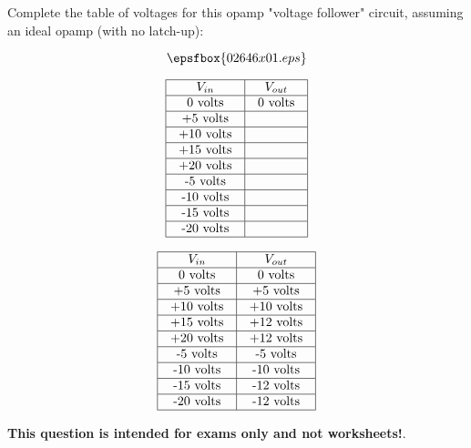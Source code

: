 

Complete the table of voltages for this opamp "voltage follower" circuit, assuming an ideal opamp (with no latch-up):

$$\epsfbox{02646x01.eps}$$


$$\vbox{\offinterlineskip
\halign{\strut
\vrule \quad\hfil # \ \hfil & 
\vrule \quad\hfil # \ \hfil \vrule \cr
\noalign{\hrule}
%
$V_{in}$ & $V_{out}$ \cr
%
\noalign{\hrule}
%
0 volts & 0 volts \cr
%
\noalign{\hrule}
%
+5 volts &  \cr
%
\noalign{\hrule}
%
+10 volts &  \cr
%
\noalign{\hrule}
%
+15 volts &  \cr
%
\noalign{\hrule}
%
+20 volts &  \cr
%
\noalign{\hrule}
%
-5 volts &  \cr
%
\noalign{\hrule}
%
-10 volts &  \cr
%
\noalign{\hrule}
%
-15 volts &  \cr
%
\noalign{\hrule}
%
-20 volts &  \cr
%
\noalign{\hrule}
} %
}$$ %








$$\vbox{\offinterlineskip
\halign{\strut
\vrule \quad\hfil # \ \hfil & 
\vrule \quad\hfil # \ \hfil \vrule \cr
\noalign{\hrule}
%
$V_{in}$ & $V_{out}$ \cr
%
\noalign{\hrule}
%
0 volts & 0 volts \cr
%
\noalign{\hrule}
%
+5 volts & +5 volts \cr
%
\noalign{\hrule}
%
+10 volts & +10 volts \cr
%
\noalign{\hrule}
%
+15 volts & +12 volts \cr
%
\noalign{\hrule}
%
+20 volts & +12 volts \cr
%
\noalign{\hrule}
%
-5 volts & -5 volts \cr
%
\noalign{\hrule}
%
-10 volts & -10 volts \cr
%
\noalign{\hrule}
%
-15 volts & -12 volts \cr
%
\noalign{\hrule}
%
-20 volts & -12 volts \cr
%
\noalign{\hrule}
} %
}$$ %







{\bf This question is intended for exams only and not worksheets!}.




